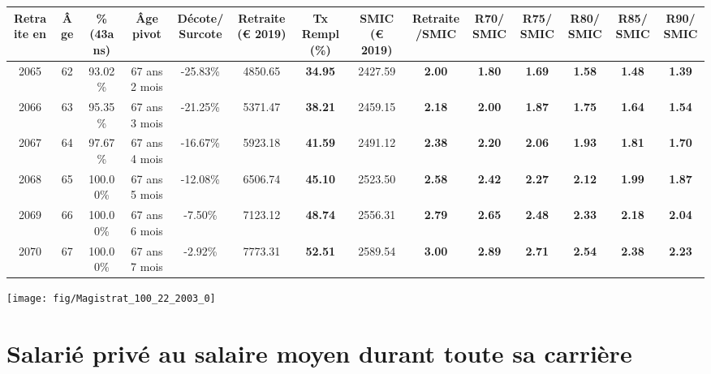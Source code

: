 \begin{adjustbox}{max width=\textwidth} 
\begin{tabular}[htb]{|c|c||c|c|c||c|c||c|c||c|c|c|c|c|} 
\hline 
 Retraite en &  Âge &  \%(43ans) &  Âge pivot &  Décote/Surcote &  Retraite (\euro{} 2019) &  Tx Rempl(\%) &  SMIC (\euro{} 2019) &  Retraite/SMIC &  R70/SMIC &  R75/SMIC &  R80/SMIC &  R85/SMIC &  R90/SMIC \\ 
\hline \hline 
 2065 &  62 &  93.02\% &  67 ans 2 mois &  -25.83\% &  4850.65 &  {\bf 34.95} &  2427.59 &  {\bf 2.00} &  {\bf 1.80} &  {\bf 1.69} &  {\bf 1.58} &  {\bf 1.48} &  {\bf 1.39} \\ 
\hline 
 2066 &  63 &  95.35\% &  67 ans 3 mois &  -21.25\% &  5371.47 &  {\bf 38.21} &  2459.15 &  {\bf 2.18} &  {\bf 2.00} &  {\bf 1.87} &  {\bf 1.75} &  {\bf 1.64} &  {\bf 1.54} \\ 
\hline 
 2067 &  64 &  97.67\% &  67 ans 4 mois &  -16.67\% &  5923.18 &  {\bf 41.59} &  2491.12 &  {\bf 2.38} &  {\bf 2.20} &  {\bf 2.06} &  {\bf 1.93} &  {\bf 1.81} &  {\bf 1.70} \\ 
\hline 
 2068 &  65 &  100.00\% &  67 ans 5 mois &  -12.08\% &  6506.74 &  {\bf 45.10} &  2523.50 &  {\bf 2.58} &  {\bf 2.42} &  {\bf 2.27} &  {\bf 2.12} &  {\bf 1.99} &  {\bf 1.87} \\ 
\hline 
 2069 &  66 &  100.00\% &  67 ans 6 mois &  -7.50\% &  7123.12 &  {\bf 48.74} &  2556.31 &  {\bf 2.79} &  {\bf 2.65} &  {\bf 2.48} &  {\bf 2.33} &  {\bf 2.18} &  {\bf 2.04} \\ 
\hline 
 2070 &  67 &  100.00\% &  67 ans 7 mois &  -2.92\% &  7773.31 &  {\bf 52.51} &  2589.54 &  {\bf 3.00} &  {\bf 2.89} &  {\bf 2.71} &  {\bf 2.54} &  {\bf 2.38} &  {\bf 2.23} \\ 
\hline 
\hline 
\end{tabular} 
\end{adjustbox} 
 
 \vspace{0.1cm} 

 {\hspace{-2.2cm}\texttt{[image: fig/Magistrat\_100\_22\_2003\_0]}} 

\newpage 
 
\chapter{Salarié privé au salaire moyen durant toute sa carrière} 

~\\ 
 
